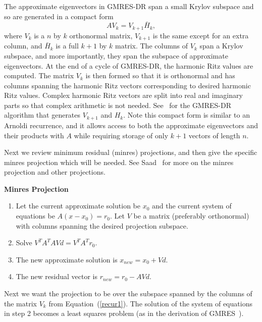 \documentclass[final]{siamltex}
\begin{document}
The approximate eigenvectors in GMRES-DR span a small Krylov subspace and so are generated in a compact form 
\begin{equation}
 AV_k = V_{k+1} \bar H_k, \label{recur1}
\end{equation} 
where $V_k$ is a $n$ by $k$ orthonormal matrix, $V_{k+1}$ is the same except for an extra column, and $\bar H_k$ is a full $k+1$ by $k$ matrix.  The columns of $V_k$ span a Krylov subspace, and more importantly, they span the subspace of approximate eigenvectors.  At the end of a cycle of GMRES-DR, the harmonic Ritz values are computed.  The matrix $V_k$ is then formed so that it is orthonormal and has columns spanning the harmonic Ritz vectors corresponding to desired harmonic Ritz values.  Complex harmonic Ritz vectors are split into real and imaginary parts so that complex arithmetic is not needed.  See~\cite{GMRES-DR} for the GMRES-DR algorithm that generates $V_{k+1}$ and $H_k$.  Note this compact form is similar to an Arnoldi recurrence, and it allows access to both the approximate eigenvectors and their products with $A$ while requiring storage of only $k+1$ vectors of length $n$.    

Next we review minimum residual (minres) projections, and then give the specific minres projection which will be needed.  See Saad~\cite{Sa96} for more on the minres projection and other projections.  

\vspace{.10in}
\begin{center}
\textbf{Minres Projection}
\end{center}
\begin{enumerate}
 \item Let the current approximate solution be $x_0$ and the current system
of equations be $A(x-x_0) = r_0$.  Let $V$ be a matrix (preferably orthonormal) with columns spanning the desired projection subspace.  
 \item Solve $V^T A^T A Vd = V^T A^T r_0$.
 \item The new approximate solution is $x_{new} = x_0 + Vd$.
 \item The new residual vector is $r_{new} = r_0 - AVd $.
\end{enumerate} 
\vspace{.15in}

Next we want the projection to be over the subspace spanned by the columns of the matrix $V_k$ from Equation~(\ref{recur1}).  The solution of the system of equations in step 2 becomes a least squares problem (as in the derivation of GMRES~\cite{Sa96}).
\end{document}
